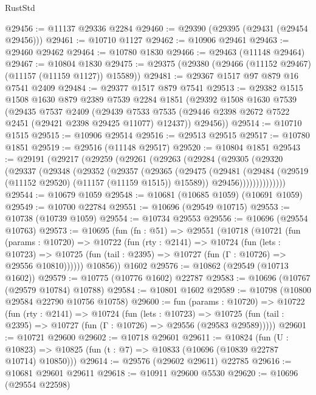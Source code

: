 \begin{lexlean}{RustStd}
\begin{coremodule}
@29456 := @11137 @29336 @2284
@29460 := @29390 (@29395 (@29431 (@29454 @29456)))
@29461 := @10710 @1127
@29462 := @10906 @29461
@29463 := @29460 @29462
@29464 := @10780 @1830
@29466 := @29463 (@11148 @29464)
@29467 := @10804 @1830
@29475 := @29375 (@29380 (@29466 (@11152 @29467) (@11157 (@11159 @1127)) @15589))
@29481 := @29367 @1517 @97 @879 @16 @7541 @2409
@29484 := @29377 @1517 @879 @7541
@29513 := @29382
    @1515
    @1508
    @1630
    @879
    @2389
    @7539
    @2284
    @1851
    (@29392
      @1508
      @1630
      @7539
      (@29435
        @7537
        @2409
        (@29439 @7533 @7535 (@29446 @2398 @2672 @7522 @2451 (@29421 @2398 @29425 @11077) @12437))
        @29456))
@29514 := @10710 @1515
@29515 := @10906 @29514
@29516 := @29513 @29515
@29517 := @10780 @1851
@29519 := @29516 (@11148 @29517)
@29520 := @10804 @1851
@29543 := @29191
    (@29217
      (@29259
        (@29261
          (@29263
            (@29284
              (@29305
                (@29320
                  (@29337
                    (@29348
                      (@29352
                        (@29357
                          (@29365
                            (@29475
                              (@29481
                                (@29484 (@29519 (@11152 @29520) (@11157 (@11159 @1515)) @15589))
                                @29456))))))))))))))
@29544 := @10679 @1059
@29548 := @10681 (@10685 @1059) (@10691 @1059)
@29549 := @10700 @22784
@29551 := @10696 (@29549 @10715)
@29553 := @10738 (@10739 @1059)
@29554 := @10734 @29553
@29556 := @10696 (@29554 @10763)
@29573 := @10695
    (fun (fn : @51) =>
    @29551
      (@10718
        (@10721
          (fun (params : @10720) =>
          @10722
            (fun (rty : @2141) =>
            @10724
              (fun (lets : @10723) =>
              @10725 (fun (tail : @2395) => @10727 (fun (Γ : @10726) => @29556 @10810))))))
        @10856))
    @1602
@29576 := @10862 (@29549 (@10713 @1602))
@29579 := @10775 (@10776 @1602) @22787
@29583 := @10696 (@10767 (@29579 @10784) @10788)
@29584 := @10801 @1602
@29589 := @10798 (@10800 @29584 @22790 @10756 @10758)
@29600 := fun (params : @10720) =>
  @10722
    (fun (rty : @2141) =>
    @10724
      (fun (lets : @10723) =>
      @10725 (fun (tail : @2395) => @10727 (fun (Γ : @10726) => @29556 (@29583 @29589)))))
@29601 := @10721 @29600
@29602 := @10718 @29601
@29611 := @10824
    (fun (U : @10823) => @10825 (fun (t : @7) => @10833 (@10696 (@10839 @22787 @10714) @10850)))
@29614 := @29576 (@29602 @29611) @22785
@29616 := @10681 @29601 @29611
@29618 := @10911 @29600 @5530
@29620 := @10696 (@29554 @22598)

\end{coremodule}
\end{lexlean}
